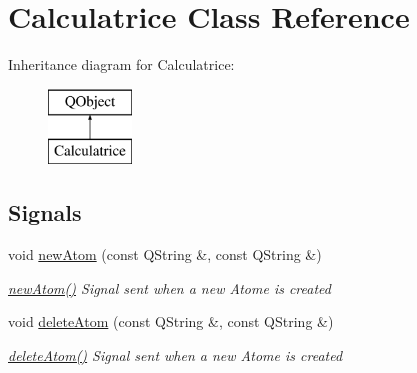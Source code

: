 \hypertarget{class_calculatrice}{}\section{Calculatrice Class Reference}
\label{class_calculatrice}
Inheritance diagram for Calculatrice\+:\begin{figure}[H]
\begin{center}
\leavevmode
\includegraphics[height=2.000000cm]{class_calculatrice}
\end{center}
\end{figure}
\subsection*{Signals}
\begin{DoxyCompactItemize}
\item 
void \hyperlink{class_calculatrice_a5b379ff16856c59cd94d0f460b0d0d73}{new\+Atom} (const Q\+String \&, const Q\+String \&)
\begin{DoxyCompactList}\small\item\em \hyperlink{class_calculatrice_a5b379ff16856c59cd94d0f460b0d0d73}{new\+Atom()} Signal sent when a new Atome is created \end{DoxyCompactList}\item 
void \hyperlink{class_calculatrice_a5c1b210bef9aa7bd162478d35412b36b}{delete\+Atom} (const Q\+String \&, const Q\+String \&)
\begin{DoxyCompactList}\small\item\em \hyperlink{class_calculatrice_a5c1b210bef9aa7bd162478d35412b36b}{delete\+Atom()} Signal sent when a new Atome is created \end{DoxyCompactList}\end{DoxyCompactItemize}
